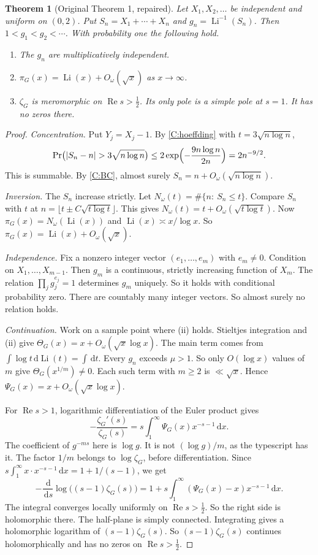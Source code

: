 \documentclass[12pt,letterpaper]{article}
\newtheorem{theorem}{Theorem}[section]
\theoremstyle{definition}
\theoremstyle{remark}
\newcommand{\Li}{\operatorname{Li}}
\newcommand{\Ree}{\operatorname{Re}}
\newcommand{\dd}{\,\mathrm{d}}
\begin{document}
\begin{theorem}[Original Theorem 1, repaired]\label{thm:random}
Let $X_1,X_2,\dots$ be independent and uniform on $(0,2)$. Put
$S_n=X_1+\cdots+X_n$ and $g_n=\Li^{-1}(S_n)$. Then $1<g_1<g_2<\cdots$.
With probability one the following hold.
\begin{enumerate}[label=(\roman*)]
\item The $g_n$ are multiplicatively independent.
\item $\pi_G(x)=\Li(x)+O_\omega(\sqrt{x})$ as $x\to\infty$.
\item $\zeta_G$ is meromorphic on $\Ree s>\frac12$. Its only pole is a
  simple pole at $s=1$. It has no zeros there.
\end{enumerate}
\end{theorem}

\begin{proof}
\emph{Concentration.} Put $Y_j=X_j-1$. By \ref{C:hoeffding} with
$t=3\sqrt{n\log n}$,
\[
\Pr\bigl(|S_n-n|>3\sqrt{n\log n}\bigr)\le2\exp\Bigl(-\frac{9n\log n}{2n}\Bigr)
=2n^{-9/2}.
\]
This is summable. By \ref{C:BC}, almost surely
$S_n=n+O_\omega(\sqrt{n\log n})$.

\emph{Inversion.} The $S_n$ increase strictly. Let
$N_\omega(t)=\#\{n:\ S_n\le t\}$. Compare $S_n$ with $t$ at
$n=\lfloor t\pm C\sqrt{t\log t}\rfloor$. This gives
$N_\omega(t)=t+O_\omega(\sqrt{t\log t})$. Now $\pi_G(x)=N_\omega(\Li(x))$
and $\Li(x)\asymp x/\log x$. So $\pi_G(x)=\Li(x)+O_\omega(\sqrt{x})$.

\emph{Independence.} Fix a nonzero integer vector $(e_1,\dots,e_m)$ with
$e_m\ne0$. Condition on $X_1,\dots,X_{m-1}$. Then $g_m$ is a continuous,
strictly increasing function of $X_m$. The relation
$\prod_jg_j^{e_j}=1$ determines $g_m$ uniquely. So it holds with
conditional probability zero. There are countably many integer vectors.
So almost surely no relation holds.

\emph{Continuation.} Work on a sample point where (ii) holds. Stieltjes
integration and (ii) give $\Theta_G(x)=x+O_\omega(\sqrt{x}\log x)$. The main
term comes from $\int\log t\dd\Li(t)=\int\dd t$. Every $g_n$ exceeds $\mu>1$.
So only $O(\log x)$ values of $m$ give $\Theta_G(x^{1/m})\ne0$. Each such
term with $m\ge2$ is $\ll\sqrt{x}$. Hence $\Psi_G(x)=x+O_\omega(\sqrt{x}\log
x)$.

For $\Ree s>1$, logarithmic differentiation of the Euler product gives
\[
-\frac{\zeta_G'(s)}{\zeta_G(s)}=s\int_1^\infty\Psi_G(x)x^{-s-1}\dd x.
\]
The coefficient of $g^{-ms}$ here is $\log g$. It is not $(\log g)/m$, as
the typescript has it. The factor $1/m$ belongs to $\log\zeta_G$, before
differentiation. Since $s\int_1^\infty x\cdot x^{-s-1}\dd x=1+1/(s-1)$, we
get
\[
-\frac{\dd}{\dd s}\log\bigl((s-1)\zeta_G(s)\bigr)
=1+s\int_1^\infty(\Psi_G(x)-x)x^{-s-1}\dd x.
\]
The integral converges locally uniformly on $\Ree s>\frac12$. So the right
side is holomorphic there. The half-plane is simply connected. Integrating
gives a holomorphic logarithm of $(s-1)\zeta_G(s)$. So $(s-1)\zeta_G(s)$
continues holomorphically and has no zeros on $\Ree s>\frac12$.
\end{proof}
\end{document}
